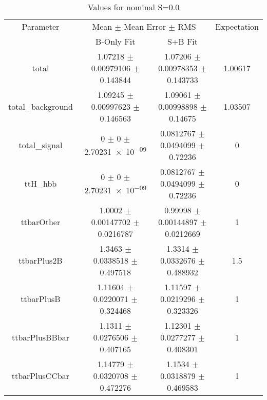\begin{table}
\centering
\caption{Values for nominal S=0.0}
\begin{tabular}{cccc}
\toprule
Parameter & \multicolumn{2}{c}{Mean $\pm$ Mean Error $\pm$ RMS} & Expectation\\
 & B-Only Fit & S+B Fit & \\
\midrule
total & \num{1.07218} $\pm$ \num{0.00979106} $\pm$ \num{0.143844} & \num{1.07206} $\pm$ \num{0.00978353} $\pm$ \num{0.143733} & \num{1.00617}\\
total\_background & \num{1.09245} $\pm$ \num{0.00997623} $\pm$ \num{0.146563} & \num{1.09061} $\pm$ \num{0.00998898} $\pm$ \num{0.14675} & \num{1.03507}\\
total\_signal & \num{0} $\pm$ \num{0} $\pm$ \num{2.70231e-09} & \num{0.0812767} $\pm$ \num{0.0494099} $\pm$ \num{0.72236} & \num{0}\\
ttH\_hbb & \num{0} $\pm$ \num{0} $\pm$ \num{2.70231e-09} & \num{0.0812767} $\pm$ \num{0.0494099} $\pm$ \num{0.72236} & \num{0}\\
ttbarOther & \num{1.0002} $\pm$ \num{0.00147702} $\pm$ \num{0.0216787} & \num{0.99998} $\pm$ \num{0.00144897} $\pm$ \num{0.0212669} & \num{1}\\
ttbarPlus2B & \num{1.3463} $\pm$ \num{0.0338518} $\pm$ \num{0.497518} & \num{1.3314} $\pm$ \num{0.0332676} $\pm$ \num{0.488932} & \num{1.5}\\
ttbarPlusB & \num{1.11604} $\pm$ \num{0.0220071} $\pm$ \num{0.324468} & \num{1.11597} $\pm$ \num{0.0219296} $\pm$ \num{0.323326} & \num{1}\\
ttbarPlusBBbar & \num{1.1311} $\pm$ \num{0.0276506} $\pm$ \num{0.407165} & \num{1.12301} $\pm$ \num{0.0277277} $\pm$ \num{0.408301} & \num{1}\\
ttbarPlusCCbar & \num{1.14779} $\pm$ \num{0.0320708} $\pm$ \num{0.472276} & \num{1.1534} $\pm$ \num{0.0318879} $\pm$ \num{0.469583} & \num{1}\\
\bottomrule
\end{tabular}
\end{table}